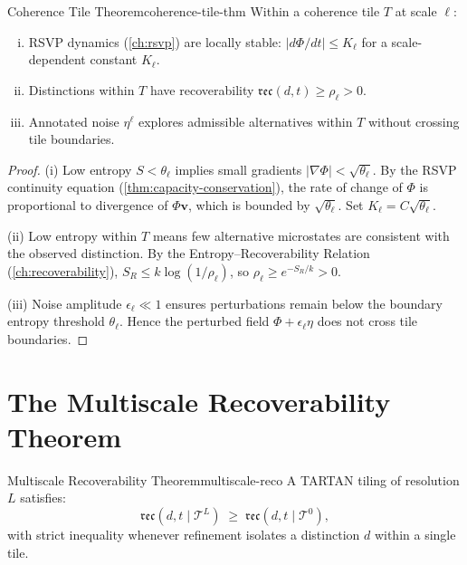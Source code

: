 \documentclass[12pt,twoside,openright]{book}
\newcommand{\reco}{\mathfrak{rec}}
\begin{document}
\begin{theorem}{Coherence Tile Theorem}{coherence-tile-thm}
  Within a coherence tile $T$ at scale $\ell$:
  \begin{enumerate}[(i)]
    \item RSVP dynamics (\cref{ch:rsvp}) are locally
          stable: $|d\Phi/dt| \le K_\ell$ for a
          scale-dependent constant $K_\ell$.
    \item Distinctions within $T$ have recoverability
          $\reco(d, t) \ge \rho_\ell > 0$.
    \item Annotated noise $\eta^\ell$ explores
          admissible alternatives within $T$ without
          crossing tile boundaries.
  \end{enumerate}
\end{theorem}

\begin{proof}
  (i) Low entropy $S < \theta_\ell$ implies small
  gradients $|\nabla\Phi| < \sqrt{\theta_\ell}$.
  By the RSVP continuity equation
  (\cref{thm:capacity-conservation}), the rate of
  change of $\Phi$ is proportional to divergence of
  $\Phi \mathbf{v}$, which is bounded by
  $\sqrt{\theta_\ell}$. Set
  $K_\ell = C\sqrt{\theta_\ell}$.

  (ii) Low entropy within $T$ means few alternative
  microstates are consistent with the observed
  distinction. By the Entropy--Recoverability Relation
  (\cref{ch:recoverability}), $S_R \le k\log(1/\rho_\ell)$,
  so $\rho_\ell \ge e^{-S_R/k} > 0$.

  (iii) Noise amplitude $\epsilon_\ell \ll 1$ ensures
  perturbations remain below the boundary entropy
  threshold $\theta_\ell$. Hence the perturbed field
  $\Phi + \epsilon_\ell \eta$ does not cross tile
  boundaries.
\end{proof}

\section{The Multiscale Recoverability Theorem}

\begin{theorem}{Multiscale Recoverability Theorem}{multiscale-reco}
  A TARTAN tiling of resolution $L$ satisfies:
  \[
    \reco(d, t \mid \mathcal{T}^L)
    \;\ge\;
    \reco(d, t \mid \mathcal{T}^0),
  \]
  with strict inequality whenever refinement isolates
  a distinction $d$ within a single tile.
\end{theorem}
\end{document}
